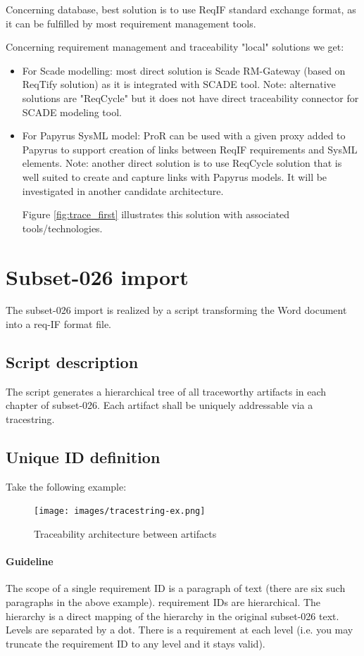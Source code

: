 \documentclass[11pt]{template/openetcs_report}
\begin{document}
Concerning database, best solution is to use ReqIF standard exchange format, as it can be fulfilled by most requirement management tools. 

Concerning requirement management and traceability "local" solutions we get: 
\begin{itemize}
\item For Scade modelling: most direct solution is Scade RM-Gateway (based on ReqTify solution) as it is integrated with SCADE tool.
Note: alternative solutions are "ReqCycle" but it does not have direct traceability connector for SCADE modeling tool.
\item For Papyrus SysML model: ProR can be used with a given proxy added to Papyrus to support creation of links between ReqIF requirements and SysML elements.
Note: another direct solution is to use ReqCycle solution that is well suited to create and capture links with Papyrus models. It will be investigated in another candidate architecture.

Figure \ref{fig:trace_first} illustrates this solution with associated tools/technologies.

\end{itemize}



\section{Subset-026 import}
\label{sec-5-1}
The subset-026 import is realized by a script transforming the Word document
into a req-IF format file.
\subsection{Script description}
\label{sec-5-1-1}
The script  generates a hierarchical tree of all traceworthy
artifacts in each chapter of subset-026. Each artifact shall be uniquely
addressable via a tracestring.


\subsection{Unique ID definition}
\label{sec-5-1-2}
Take the following example:
\begin{figure}[htb]
\centering
\texttt{[image: images/tracestring-ex.png]}
\caption{\label{fig:reqID_ex}Traceability architecture between artifacts}
\end{figure}


\paragraph{Guideline}
The scope of a single requirement ID is a paragraph of text (there are six such
paragraphs in the above example).  requirement IDs are hierarchical. The
hierarchy is a direct mapping of the hierarchy in the original subset-026
text. Levels are separated by a dot. There is a requirement at each level
(i.e. you may truncate the requirement ID to any level and it stays valid).
\end{document}
